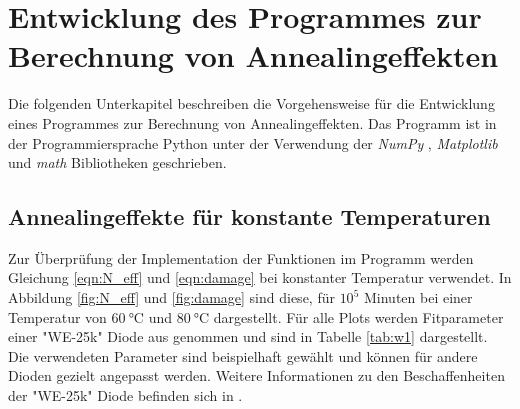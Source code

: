 \chapter{Entwicklung des Programmes zur Berechnung von Annealingeffekten}\label{make}
Die folgenden Unterkapitel beschreiben die Vorgehensweise für die Entwicklung  eines Programmes zur
Berechnung von Annealingeffekten. Das Programm ist in der Programmiersprache Python unter
der Verwendung der \textit{NumPy} \cite{oliphant2006guide}, \textit{Matplotlib} \cite{Hunter:2007} und \textit{math} Bibliotheken geschrieben.
\section{Annealingeffekte für konstante Temperaturen}
Zur Überprüfung der Implementation der Funktionen im Programm werden
Gleichung \ref{eqn:N_eff} und \ref{eqn:damage}  bei konstanter Temperatur verwendet. In
Abbildung \ref{fig:N_eff} und \ref{fig:damage} sind diese, für $10^5$ Minuten bei einer Temperatur
von $\SI{60}{\celsius}$ und $\SI{80}{\celsius}$  dargestellt.
Für alle Plots werden Fitparameter
einer "WE-25k" Diode aus \cite{moll} genommen und sind in Tabelle \ref{tab:w1} dargestellt. Die verwendeten
Parameter sind beispielhaft gewählt und können für andere Dioden gezielt angepasst werden.
Weitere Informationen zu den Beschaffenheiten der "WE-25k" Diode befinden sich in \cite{moll}.


